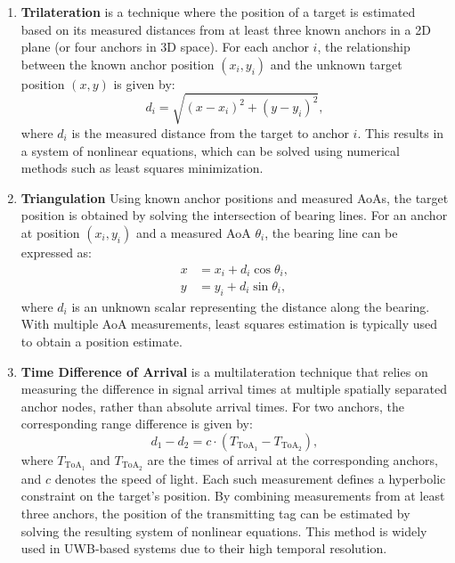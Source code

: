 \begin{enumerate}
    \item \textbf{Trilateration} is a technique where the position of a target is estimated based on its measured distances from at least three known anchors in a 2D plane (or four anchors in 3D space). For each anchor $i$, the relationship between the known anchor position $(x_i, y_i)$ and the unknown target position $(x, y)$ is given by:
    \begin{equation}
    d_i = \sqrt{(x - x_i)^2 + (y - y_i)^2},
    \end{equation}
    where $d_i$ is the measured distance from the target to anchor $i$. This results in a system of nonlinear equations, which can be solved using numerical methods such as least squares minimization.

    \item \textbf{Triangulation}
    Using known anchor positions and measured AoAs, the target position is obtained by solving the intersection of bearing lines. For an anchor at position $(x_i, y_i)$ and a measured AoA $\theta_i$, the bearing line can be expressed as:
    \begin{align}
    x &= x_i + d_i \cos \theta_i, \\
    y &= y_i + d_i \sin \theta_i,
    \end{align}
    where $d_i$ is an unknown scalar representing the distance along the bearing. With multiple AoA measurements, least squares estimation is typically used to obtain a position estimate.

    \item \textbf{Time Difference of Arrival} is a multilateration technique that relies on measuring the difference in signal arrival times at multiple spatially separated anchor nodes, rather than absolute arrival times. For two anchors, the corresponding range difference is given by:
    \begin{equation} 
    d_1 - d_2 = c \cdot (T_{\text{ToA}_1} - T_{\text{ToA}_2}), 
    \end{equation}
    where $T_{\text{ToA}_1}$ and $T_{\text{ToA}_2}$ are the times of arrival at the corresponding anchors, and $c$ denotes the speed of light. Each such measurement defines a hyperbolic constraint on the target's position. By combining measurements from at least three anchors, the position of the transmitting tag can be estimated by solving the resulting system of nonlinear equations. This method is widely used in UWB-based systems due to their high temporal resolution.
\end{enumerate}

